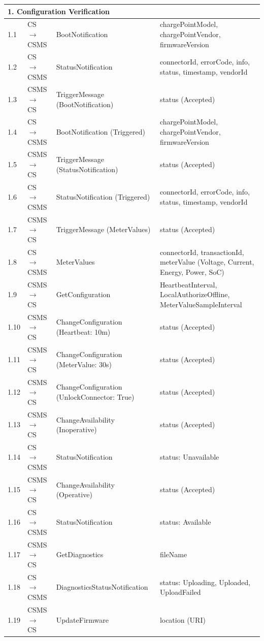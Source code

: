 \documentclass[a4paper,11pt]{report}
\begin{document}
\begin{footnotesize}
\begin{longtable}{|p{1.2cm}|p{2.5cm}|p{5.5cm}|p{6cm}|}
\multicolumn{4}{|l|}{\textbf{1. Configuration Verification}} \\
\hline
1.1 & CS $\to$ CSMS & BootNotification & chargePointModel, chargePointVendor, firmwareVersion \\
\hline
1.2 & CS $\to$ CSMS & StatusNotification & connectorId, errorCode, info, status, timestamp, vendorId \\
\hline
1.3 & CSMS $\to$ CS & TriggerMessage (BootNotification) & status (Accepted) \\
\hline
1.4 & CS $\to$ CSMS & BootNotification (Triggered) & chargePointModel, chargePointVendor, firmwareVersion \\
\hline
1.5 & CSMS $\to$ CS & TriggerMessage (StatusNotification) & status (Accepted) \\
\hline
1.6 & CS $\to$ CSMS & StatusNotification (Triggered) & connectorId, errorCode, info, status, timestamp, vendorId \\
\hline
1.7 & CSMS $\to$ CS & TriggerMessage (MeterValues) & status (Accepted) \\
\hline
1.8 & CS $\to$ CSMS & MeterValues & connectorId, transactionId, meterValue (Voltage, Current, Energy, Power, SoC) \\
\hline
1.9 & CSMS $\to$ CS & GetConfiguration & HeartbeatInterval, LocalAuthorizeOffline, MeterValueSampleInterval \\
\hline
1.10 & CSMS $\to$ CS & ChangeConfiguration (Heartbeat: 10m) & status (Accepted) \\
\hline
1.11 & CSMS $\to$ CS & ChangeConfiguration (MeterValue: 30s) & status (Accepted) \\
\hline
1.12 & CSMS $\to$ CS & ChangeConfiguration (UnlockConnector: True) & status (Accepted) \\
\hline
1.13 & CSMS $\to$ CS & ChangeAvailability (Inoperative) & status (Accepted) \\
\hline
1.14 & CS $\to$ CSMS & StatusNotification & status: Unavailable \\
\hline
1.15 & CSMS $\to$ CS & ChangeAvailability (Operative) & status (Accepted) \\
\hline
1.16 & CS $\to$ CSMS & StatusNotification & status: Available \\
\hline
1.17 & CSMS $\to$ CS & GetDiagnostics & fileName \\
\hline
1.18 & CS $\to$ CSMS & DiagnosticsStatusNotification & status: Uploading, Uploaded, UploadFailed \\
\hline
1.19 & CSMS $\to$ CS & UpdateFirmware & location (URI) \\

\end{longtable}
\end{footnotesize}
\end{document}
